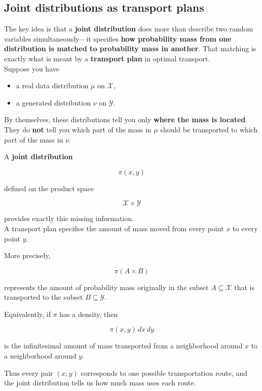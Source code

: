 \begin{appendices}


\chapter{Joint distributions as transport plans}


The key idea is that a \textbf{joint distribution} does more than describe two random variables simultaneously---it specifies \textbf{how probability mass from one distribution is matched to probability mass in another}. That matching is exactly what is meant by a \textbf{transport plan} in optimal transport.\\

Suppose you have

\begin{itemize}
    \item a real data distribution $\mu$ on $\mathcal{X}$,
    \item a generated distribution $\nu$ on $\mathcal{Y}$.
\end{itemize}

By themselves, these distributions tell you only \textbf{where the mass is located}. They do \textbf{not} tell you which part of the mass in $\mu$ should be transported to which part of the mass in $\nu$.

A \textbf{joint distribution}

\[
\pi(x,y)
\]

defined on the product space

\[
\mathcal{X}\times\mathcal{Y}
\]

provides exactly this missing information.\\


A transport plan specifies the amount of mass moved from every point $x$ to every point $y$.

More precisely,

\[
\pi(A\times B)
\]

represents the amount of probability mass originally in the subset $A\subseteq\mathcal{X}$ that is transported to the subset $B\subseteq\mathcal{Y}$.

Equivalently, if $\pi$ has a density, then

\[
\pi(x,y)\,dx\,dy
\]

is the infinitesimal amount of mass transported from a neighborhood around $x$ to a neighborhood around $y$.

Thus every pair $(x,y)$ corresponds to one possible transportation route, and the joint distribution tells us how much mass uses each route.\\


\end{appendices}
